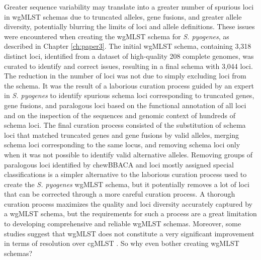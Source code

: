 Greater sequence variability may translate into a greater number of spurious loci in wgMLST schemas due to truncated alleles, gene fusions, and greater allele diversity, potentially blurring the limits of loci and allele definitions. These issues were encountered when creating the wgMLST schema for \textit{S. pyogenes}, as described in Chapter \ref{ch:paper3}. The initial wgMLST schema, containing 3,318 distinct loci, identified from a dataset of high-quality 208 complete genomes, was curated to identify and correct issues, resulting in a final schema with 3,044 loci. The reduction in the number of loci was not due to simply excluding loci from the schema. It was the result of a laborious curation process guided by an expert in \textit{S. pyogenes} to identify spurious schema loci corresponding to truncated genes, gene fusions, and paralogous loci based on the functional annotation of all loci and on the inspection of the sequences and genomic context of hundreds of schema loci. The final curation process consisted of the substitution of schema loci that matched truncated genes and gene fusions by valid alleles, merging schema loci corresponding to the same locus, and removing schema loci only when it was not possible to identify valid alternative alleles. Removing groups of paralogous loci identified by chewBBACA and loci mostly assigned special classifications is a simpler alternative to the laborious curation process used to create the \textit{S. pyogenes} wgMLST schema, but it potentially removes a lot of loci that can be corrected through a more careful curation process. A thorough curation process maximizes the quality and loci diversity accurately captured by a wgMLST schema, but the requirements for such a process are a great limitation to developing comprehensive and reliable wgMLST schemas. Moreover, some studies suggest that wgMLST does not constitute a very significant improvement in terms of resolution over cgMLST \cite{uelze_typing_2020}. So why even bother creating wgMLST schemas?

